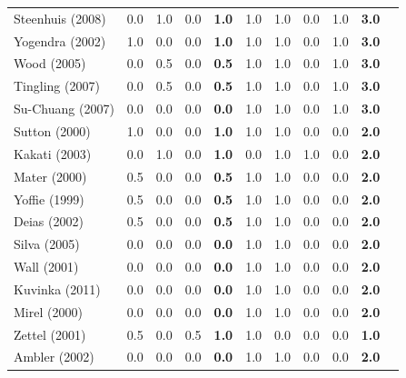 \documentclass[final,5p,times,twocolumn]{elsarticle}
\begin{document}
\begin{longtable}{|l|ccc|c|cccc|c|c|}
Steenhuis (2008) & 0.0   & 1.0   & 0.0   & \textbf{1.0} & 1.0   & 1.0   & 0.0   & 1.0   & \textbf{3.0} & \cite{Steenhuis2008} \\
Yogendra (2002) & 1.0   & 0.0   & 0.0   & \textbf{1.0} & 1.0   & 1.0   & 0.0   & 1.0   & \textbf{3.0} & \cite{Yogendra2002} \\
Wood (2005) & 0.0   & 0.5   & 0.0   & \textbf{0.5} & 1.0   & 1.0   & 0.0   & 1.0   & \textbf{3.0} & \cite{Wood2005} \\
Tingling (2007) & 0.0   & 0.5   & 0.0   & \textbf{0.5} & 1.0   & 1.0   & 0.0   & 1.0   & \textbf{3.0} & \cite{Tingling2007} \\
Su-Chuang (2007) & 0.0   & 0.0   & 0.0   & \textbf{0.0} & 1.0   & 1.0   & 0.0   & 1.0   & \textbf{3.0} & \cite{Su-Chan2007} \\
Sutton (2000) & 1.0   & 0.0   & 0.0   & \textbf{1.0} & 1.0   & 1.0   & 0.0   & 0.0   & \textbf{2.0} & \cite{Sutton2000} \\
Kakati (2003) & 0.0   & 1.0   & 0.0   & \textbf{1.0} & 0.0   & 1.0   & 1.0   & 0.0   & \textbf{2.0} & \cite{Kakati2003} \\
Mater (2000) & 0.5   & 0.0   & 0.0   & \textbf{0.5} & 1.0   & 1.0   & 0.0   & 0.0   & \textbf{2.0} & \cite{Mater2000} \\
Yoffie (1999) & 0.5   & 0.0   & 0.0   & \textbf{0.5} & 1.0   & 1.0   & 0.0   & 0.0   & \textbf{2.0} & \cite{Yoffie1999} \\
Deias  (2002) & 0.5   & 0.0   & 0.0   & \textbf{0.5} & 1.0   & 1.0   & 0.0   & 0.0   & \textbf{2.0} & \cite{Deias} \\
Silva (2005) & 0.0   & 0.0   & 0.0   & \textbf{0.0} & 1.0   & 1.0   & 0.0   & 0.0   & \textbf{2.0} & \cite{Silva2005} \\
Wall (2001) & 0.0   & 0.0   & 0.0   & \textbf{0.0} & 1.0   & 1.0   & 0.0   & 0.0   & \textbf{2.0} & \cite{Wall2001} \\
Kuvinka (2011) & 0.0   & 0.0   & 0.0   & \textbf{0.0} & 1.0   & 1.0   & 0.0   & 0.0   & \textbf{2.0} & \cite{Kuvinka2011} \\
Mirel (2000) & 0.0   & 0.0   & 0.0   & \textbf{0.0} & 1.0   & 1.0   & 0.0   & 0.0   & \textbf{2.0} & \cite{Mirel2000} \\
Zettel (2001) & 0.5   & 0.0   & 0.5   & \textbf{1.0} & 1.0   & 0.0   & 0.0   & 0.0   & \textbf{1.0} & \cite{Zettel2001} \\
Ambler (2002) & 0.0   & 0.0   & 0.0   & \textbf{0.0} & 1.0   & 1.0   & 0.0   & 0.0   & \textbf{2.0} & \cite{Ambler2002} \\

\end{longtable}
\end{document}
